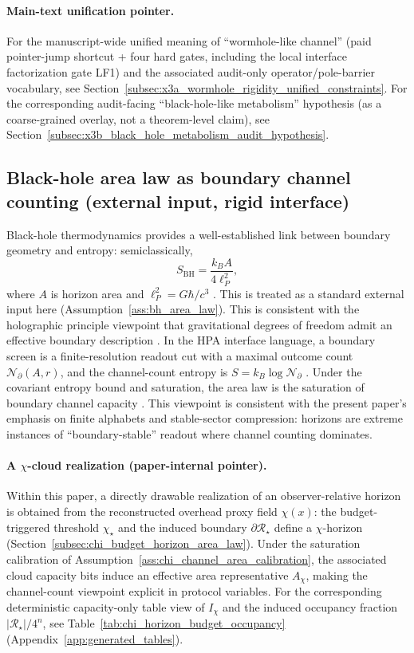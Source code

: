 \paragraph{Main-text unification pointer.}
\AuditTag For the manuscript-wide unified meaning of ``wormhole-like channel'' (paid pointer-jump shortcut + four hard gates, including the local interface factorization gate LF1) and the associated audit-only operator/pole-barrier vocabulary,
see Section~\ref{subsec:x3a_wormhole_rigidity_unified_constraints}.
For the corresponding audit-facing ``black-hole-like metabolism'' hypothesis (as a coarse-grained overlay, not a theorem-level claim),
see Section~\ref{subsec:x3b_black_hole_metabolism_audit_hypothesis}.

\subsection{Black-hole area law as boundary channel counting (external input, rigid interface)}
\label{app:bh_area_law_pointer}

Black-hole thermodynamics provides a well-established link between boundary geometry and entropy: semiclassically,
\[
S_{\mathrm{BH}}=\frac{k_B A}{4\ell_P^2},
\]
where $A$ is horizon area and $\ell_P^2=G\hbar/c^3$ \cite{Bekenstein1973,BardeenCarterHawking1973,Hawking1972BlackHoles,Hawking1975,Wald1993Noether,Bousso2002}.
This is treated as a standard external input here (Assumption~\ref{ass:bh_area_law}).
This is consistent with the holographic principle viewpoint that gravitational degrees of freedom admit an effective boundary description \cite{tHooft1993,Susskind1995,Bousso2002}.
In the HPA interface language, a boundary screen is a finite-resolution readout cut with a maximal outcome count $\mathcal{N}_\partial(A,r)$, and the channel-count entropy is $S=k_B\log\mathcal{N}_\partial$ \cite{Shannon1948,CoverThomas2006}.
Under the covariant entropy bound and saturation, the area law is the saturation of boundary channel capacity \cite{Bousso2002}.
This viewpoint is consistent with the present paper's emphasis on finite alphabets and stable-sector compression: horizons are extreme instances of ``boundary-stable'' readout where channel counting dominates.

\paragraph{A $\chi$-cloud realization (paper-internal pointer).}
\InterfaceTag Within this paper, a directly drawable realization of an observer-relative horizon is obtained from the reconstructed overhead proxy field $\chi(x)$:
the budget-triggered threshold $\chi_\star$ and the induced boundary $\partial\mathcal R_\star$ define a $\chi$-horizon (Section~\ref{subsec:chi_budget_horizon_area_law}).
\MatchTag Under the saturation calibration of Assumption~\ref{ass:chi_channel_area_calibration}, the associated cloud capacity bits induce an effective area representative $A_\chi$, making the channel-count viewpoint explicit in protocol variables.
For the corresponding deterministic capacity-only table view of $I_\chi$ and the induced occupancy fraction $|{\mathcal R}_\star|/4^n$, see Table~\ref{tab:chi_horizon_budget_occupancy} (Appendix~\ref{app:generated_tables}).

